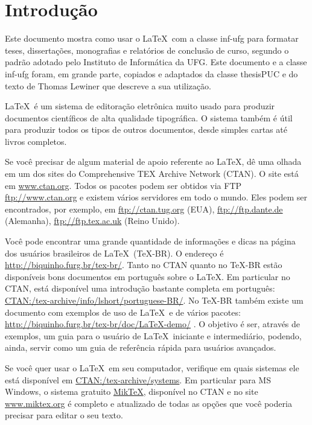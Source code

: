 
\chapter{Introdução}
\label{cap:intro}

Este documento mostra como usar o \LaTeX\ com a classe \textsf{inf-ufg} para formatar teses, dissertações, monografias e relatórios de conclusão de curso, segundo o padrão adotado pelo Instituto de Informática da UFG. Este documento e a classe \textsf{inf-ufg} foram, em grande parte, copiados e adaptados da classe \textsf{thesisPUC} e do texto de Thomas Lewiner \cite{Lew2002} que descreve a sua utilização.

 \LaTeX\ é um sistema de editoração eletrônica muito usado para produzir documentos científicos de alta qualidade tipográfica. O sistema também é útil para produzir todos os tipos de outros documentos, desde simples cartas até livros completos.

Se você precisar de algum material de apoio referente ao \LaTeX, dê uma olhada em um dos sites do Comprehensive TEX Archive Network (CTAN). O site está em \href{http://www.ctan.org/}{www.ctan.org}. Todos os pacotes podem ser obtidos via \textsf{FTP} \href{ftp://www.ctan.org/}{ftp://www.ctan.org} e existem vários servidores em todo o mundo. Eles podem ser encontrados, por exemplo, em \href{ftp://ctan.tug.org/}{ftp://ctan.tug.org} (EUA), \href{ftp://ftp.dante.de/}{ftp://ftp.dante.de} (Alemanha), \href{ftp://ftp.tex.ac.uk/}{ftp://ftp.tex.ac.uk} (Reino Unido).

Você pode encontrar uma grande quantidade de informações e dicas na página dos usuários brasileiros de \LaTeX\ (\TeX-BR). O endereço é \href{http://biquinho.furg.br/tex-br/}{http://biquinho.furg.br/tex-br/}.
Tanto no CTAN quanto no \TeX-BR estão disponíveis bons documentos em português sobre o \LaTeX. Em particular no CTAN, está disponível uma introdução bastante completa em português: \href{http://www.ctan.org/tex-archive/info/lshort/portuguese-BR/lshortBR.pdf}{CTAN:/tex-archive/info/lshort/portuguese-BR/}. No \TeX-BR também existe um documento com exemplos de uso de \LaTeX\ e de vários pacotes: \href{http://biquinho.furg.br/tex-br/doc/LaTeX-demo/}{http://biquinho.furg.br/tex-br/doc/LaTeX-demo/} . O objetivo é ser, através de exemplos, um guia para o usuário de \LaTeX\ iniciante e intermediário, podendo, ainda, servir como um guia de referência rápida para usuários avançados.

Se você quer usar o \LaTeX\ em seu computador, verifique em quais sistemas ele está disponível em \href{http://www.ctan.org/tex-archive/systems/}{CTAN:/tex-archive/systems}. Em particular para \textsf{MS Windows}, o sistema gratuito \href{http://www.miktex.org/}{MikTeX}, disponível no CTAN e no site \href{http://www.miktex.org/}{www.miktex.org} é completo e atualizado de todas as opções  que você poderia precisar para editar o seu texto.


